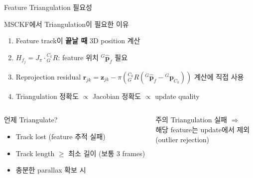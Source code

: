 \begin{frame}{Feature Triangulation 필요성}
  \begin{block}{MSCKF에서 Triangulation이 필요한 이유}
    \begin{enumerate}
      \item Feature track이 \textbf{끝날 때} 3D position 계산
      \item $H_{f_j} = J_\pi \cdot {}^{C_k}_G R$: feature 위치 ${}^G\hat{\bm{p}}_f$ 필요
      \item Reprojection residual $\bm{r}_{jk} = \bm{z}_{jk} - \pi({}^{C_k}_G R({}^G\hat{\bm{p}}_f - {}^G\bm{p}_{C_k}))$ 계산에 직접 사용
      \item Triangulation 정확도 $\propto$ Jacobian 정확도 $\propto$ update quality
    \end{enumerate}
  \end{block}
  \begin{columns}[T]
      \begin{exampleblock}{언제 Triangulate?}
        \begin{itemize}
          \item Track lost (feature 추적 실패)
          \item Track length $\geq$ 최소 길이 (보통 3 frames)
          \item 충분한 parallax 확보 시
        \end{itemize}
      \end{exampleblock}
      \begin{alertblock}{주의}
        Triangulation 실패 $\Rightarrow$\\
        해당 feature는 update에서 제외\\
        (outlier rejection)
      \end{alertblock}
  \end{columns}
\end{frame}


